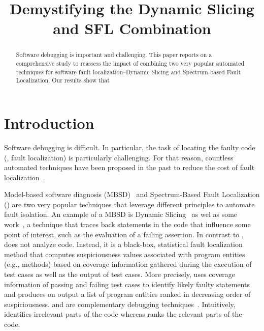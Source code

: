 \documentclass{article}
\title{Demystifying the Dynamic Slicing and SFL Combination}
\begin{document}
\maketitle

\begin{abstract}
  Software debugging is important and challenging. This paper reports
  on a comprehensive study to reassess the impact of combining two
  very popular automated techniques for software fault
  localization--Dynamic Slicing and Spectrum-based Fault
  Localization. Our results show that 
\end{abstract}

\section{Introduction}

Software debugging is difficult. In particular, the task of locating the faulty
code (\ie{}, fault localization) is particularly challenging. For that reason,
countless automated techniques have been proposed in the past to reduce the cost
of fault localization~\cite{7390282}.



Model-based software diagnosis (MBSD)~\cite{REITER198757,DEKLEER200325} and Spectrum-Based Fault Localization
(\sfl{}) are two very popular techniques that leverage different principles
to automate fault isolation. An example of a MBSD is Dynamic
Slicing~\cite{Agrawal:1990:DPS:93542.93576}
as wel as some work~\cite{Perez:2018:LQR:3304889.3304927}, a technique that traces back statements
in the code that influence some point of interest, such as the evaluation
of a failing assertion. In contrast to \ds{}, \sfl{}~\cite{7390282}
does not analyze code. Instead, it is a black-box, statistical fault
localization method that computes suspiciousness values associated
with program entities (e.g., methods) based on coverage information gathered
during the execution of test cases as well as the
output of test cases. More precisely, \sfl{} uses coverage information
of passing and failing test cases to identify likely faulty
statements and produces on output a list of program entities ranked in
decreasing order of suspiciousness.
\ds{} and \sfl{} are complementary debugging techniques~\cite{DBLP:conf/sac/AbreuGZG08}.
Intuitively, \ds{} identifies irrelevant parts of the code whereas \sfl{}
ranks the relevant parts of the code.
\end{document}
